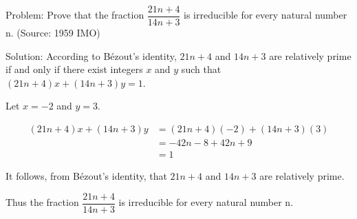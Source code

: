 Problem: Prove that the fraction $\dfrac{21n + 4}{14n + 3}$ is irreducible for every natural number n. (Source: 1959 IMO)

Solution: According to Bézout's identity, $21n + 4$ and $14n + 3$ are relatively prime if and only if there exist integers $x$ and $y$ such that $(21n + 4)x + (14n + 3)y = 1$.

Let $x = -2$ and $y = 3$.

\begin{align*}
(21n + 4)x + (14n + 3)y &= (21n + 4)(-2) + (14n + 3)(3) \\
&= -42n - 8 + 42n + 9 \\
&= 1
\end{align*}

It follows, from Bézout's identity, that $21n + 4$ and $14n + 3$ are relatively prime.

Thus the fraction $\dfrac{21n + 4}{14n + 3}$ is irreducible for every natural number n.
